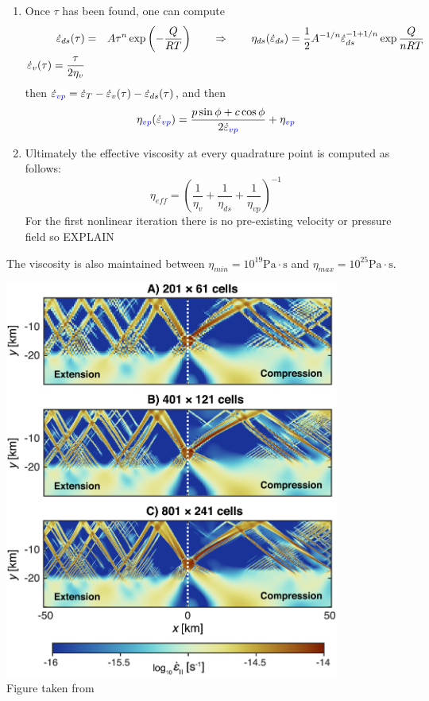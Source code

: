 \begin{enumerate}
{\it Say something about when we stop iterating}

\item Once $\tau$ has been found, one can compute 
\begin{eqnarray}
\dot{\varepsilon}_{ds}(\tau)&=&A \tau^n \exp \left(-\frac{Q}{RT}\right)
\qquad \Rightarrow \qquad 
\eta_{ds}(\dot\varepsilon_{ds}) = \frac{1}{2} A^{-1/n} \dot{\varepsilon}_{ds}^{-1+1/n} \exp \frac{Q}{nRT} \nonumber\\
\dot{\varepsilon}_{v}(\tau)=\frac{\tau}{2\eta_v}  \nonumber
\end{eqnarray}
then $\dot{\varepsilon}_{\color{blue}vp}=\dot{\varepsilon}_T -\dot{\varepsilon}_v(\tau) -\dot{\varepsilon}_{ds}(\tau)$,
and then 
\[
\eta_{\color{blue} vp}(\dot\varepsilon_{\color{blue} vp}) = \frac{p \sin \phi + c \cos \phi}{2 \dot{\varepsilon}_{\color{blue}vp}}  + \eta_{\color{blue} vp}
\]
\item 
Ultimately the effective viscosity at every quadrature point is computed as follows:
\[
\eta_{eff} = \left(\frac{1}{\eta_v} + \frac{1}{\eta_{ds}}  + \frac{1}{\eta_{vp}}  \right)^{-1}
\]
For the first nonlinear iteration there is no pre-existing velocity or pressure field so EXPLAIN 


\end{enumerate}



 
The viscosity is also maintained between $\eta_{min}=10^{19}\text{Pa}\cdot\text{s}$ 
and $\eta_{max}=10^{25}\text{Pa}\cdot\text{s}$.

\begin{center}
\includegraphics[width=11cm]{python_codes/fieldstone_70/images/fig2}\\
{\captionfont Figure taken from \cite{dudy20}}
\end{center}


